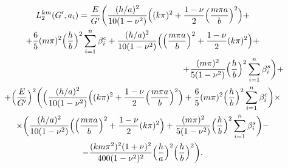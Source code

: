 \begin{multline}

\label{eq:myl:f15}

L_2^{km}(G',a_i)=\frac{E}{G'}

\biggl(

\frac{({h}/{a})^2}{10(1-\nu^2)} 

\Bigl((k\pi)^2+\frac{1-\nu}{2}\Bigl(\frac{m\pi a}{b}\Bigr)^2\Bigr)+ \\

+

\frac{6}{5}(m\pi)^2\Bigl(\frac{h}{b}\Bigr)^2\sum_{i=1}^n \beta_i^c

+\frac{({h}/{a})^2}{10(1-\nu^2)}

\Bigl(\Bigl(\frac{m\pi a}{b}\Bigr)^2+\frac{1-\nu}{2}(k\pi)^2\Bigr)+

\\

\hspace{7.5cm}

+

\frac{(m\pi)^2}{5(1-\nu^2)}

\Bigl(\frac{h}{b}\Bigr)^2\sum_{i=1}^n \beta_i^s\biggr)+

\\

+\Bigl(\frac{E}{G'}\Bigr)^2

\biggl(\Bigl(\frac{({h}/{a})^2}{10(1-\nu^2)} 

\Bigl((k\pi)^2+\frac{1-\nu}{2}\Bigl(\frac{m\pi a}{b}\Bigr)^2\Bigr)+

\frac{6}{5}(m\pi)^2\Bigl(\frac{h}{b}\Bigr)^2\sum_{i=1}^n\beta_i^c\biggr)\times

\\

\times

\biggl(\frac{({h}/{a})^2}{10(1-\nu^2)}

\Bigl(\Bigl(\frac{m\pi a}{b}\Bigr)^2+\frac{1-\nu}{2}(k\pi)^2\Bigr)+

\frac{(m\pi)^2}{5(1-\nu^2)}\Bigl(\frac{h}{b}\Bigr)^2\sum_{i=1}^n \beta_i^s\biggr)-

\\

 -\frac{(km\pi^2)^2(1+\nu)^2}{400(1-\nu^2)^2} \Bigl( \frac{h}{a} \Bigr)^2 \Bigl( \frac{h}{b} \Bigr)^2\biggr).

\end{multline}










